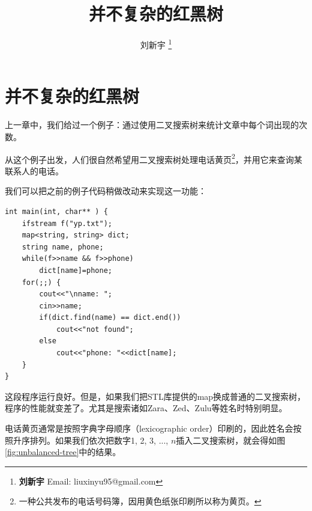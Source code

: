 \documentclass{ctexart}
\begin{document}


\title{并不复杂的红黑树}

\author{刘新宇
\thanks{{\bfseries 刘新宇} \newline
  Email: liuxinyu95@gmail.com \newline}
  }

\maketitle
\fi


\ifx\wholebook\relax
\chapter{并不复杂的红黑树}
\fi

上一章中，我们给过一个例子：通过使用二叉搜索树来统计文章中每个词出现的次数。

从这个例子出发，人们很自然希望用二叉搜索树处理电话黄页\footnote{一种公共发布的电话号码簿，因用黄色纸张印刷所以称为黄页。}，并用它来查询某联系人的电话。

我们可以把之前的例子代码稍做改动来实现这一功能：

\begin{lstlisting}
int main(int, char** ) {
    ifstream f("yp.txt");
    map<string, string> dict;
    string name, phone;
    while(f>>name && f>>phone)
        dict[name]=phone;
    for(;;) {
        cout<<"\nname: ";
        cin>>name;
        if(dict.find(name) == dict.end())
            cout<<"not found";
        else
            cout<<"phone: "<<dict[name];
    }
}
\end{lstlisting}

这段程序运行良好。但是，如果我们把STL库提供的map换成普通的二叉搜索树，程序的性能就变差了。尤其是搜索诸如Zara、Zed、Zulu等姓名时特别明显。

电话黄页通常是按照字典字母顺序（lexicographic order）印刷的，因此姓名会按照升序排列。如果我们依次把数字1, 2, 3, ..., $n$插入二叉搜索树，就会得如图\ref{fig:unbalanced-tree}中的结果。
\end{document}
